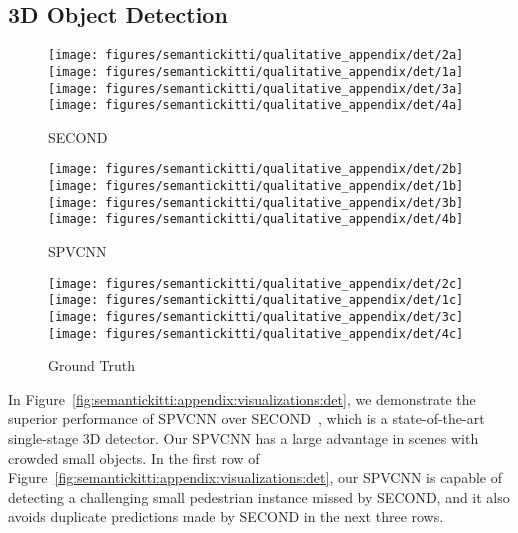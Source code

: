 \documentclass[runningheads]{llncs}
\newcommand{\fig}[1]{Figure~\ref{#1}}
\def\cnnshort{SPVCNN\xspace}
\begin{document}
\subsection{3D Object Detection}

\begin{figure*}[ht!]
    \centering
    \begin{subfigure}[t]{0.32\linewidth}
        \centering
        \texttt{[image: figures/semantickitti/qualitative\_appendix/det/2a]}
        \texttt{[image: figures/semantickitti/qualitative\_appendix/det/1a]}
        \texttt{[image: figures/semantickitti/qualitative\_appendix/det/3a]}
        \texttt{[image: figures/semantickitti/qualitative\_appendix/det/4a]}
        \caption{SECOND}
        \label{fig:semantickitti:appendix:mink:det}
    \end{subfigure}
    \begin{subfigure}[t]{0.32\linewidth}
        \centering
        \texttt{[image: figures/semantickitti/qualitative\_appendix/det/2b]}
        \texttt{[image: figures/semantickitti/qualitative\_appendix/det/1b]}
        \texttt{[image: figures/semantickitti/qualitative\_appendix/det/3b]}
        \texttt{[image: figures/semantickitti/qualitative\_appendix/det/4b]}
        \caption{\cnnshort}
        \label{fig:semantickitti:appendix:pv:det}
    \end{subfigure}
    \begin{subfigure}[t]{0.32\linewidth}
        \centering
        \texttt{[image: figures/semantickitti/qualitative\_appendix/det/2c]}
        \texttt{[image: figures/semantickitti/qualitative\_appendix/det/1c]}
        \texttt{[image: figures/semantickitti/qualitative\_appendix/det/3c]}
        \texttt{[image: figures/semantickitti/qualitative\_appendix/det/4c]}
        \caption{Ground Truth}
        \label{fig:semantickitti:appendix:gt:det}
    \end{subfigure}
    \caption{Qualitative comparisons between SECOND~\cite{yan2018second} and \cnnshort.}
    \vspace{-8pt}
    \label{fig:semantickitti:appendix:visualizations:det}
\end{figure*} 
In \fig{fig:semantickitti:appendix:visualizations:det}, we demonstrate the superior performance of \cnnshort over SECOND~\cite{yan2018second}, which is a state-of-the-art single-stage 3D detector. Our \cnnshort has a large advantage in scenes with crowded small objects. In the first row of \fig{fig:semantickitti:appendix:visualizations:det}, our \cnnshort is capable of detecting a challenging small pedestrian instance missed by SECOND, and it also avoids duplicate predictions made by SECOND in the next three rows. 
\end{document}
